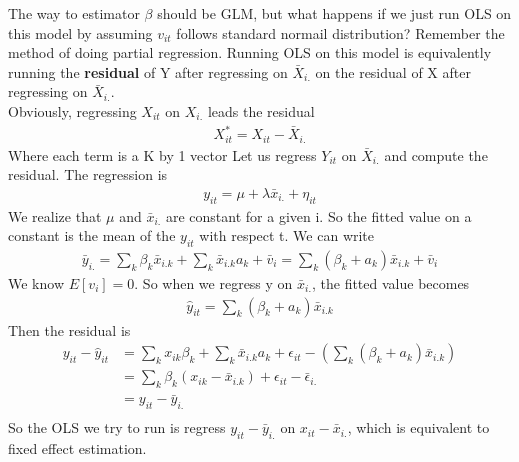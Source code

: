\documentclass[a4paper]{article}
\begin{document}
The way to estimator $\beta$ should be GLM, but what happens if we just run OLS on this model by assuming $v_{it}$ follows standard normail distribution? Remember the method of doing partial regression. Running OLS on this model is equivalently running the {\bf residual } of Y after regressing on $\bar X_{i.}$ on the residual of X after regressing on $\bar X_{i.}$. \\
Obviously, regressing $X_{it}$ on ${X_{i.}}$ leads the residual
\begin{align*}
X^{*}_{it} = X_{it} - \bar X_{i.}
\end{align*}
Where each term is a K by 1 vector
Let us regress $Y_{it}$ on ${\bar X_{i.}}$ and compute the residual. The regression is
\begin{align*}
y_{it} = \mu + \lambda \bar x_{i.} + \eta_{it}
\end{align*}
We realize that $\mu$ and $\bar x_{i.}$ are constant for a given i. So the fitted value on a constant is the mean of the $y_{it}$ with respect t.  We can write
\begin{align*}
\bar y_{i.} = \sum_k \beta_k \bar x_{i.k} + \sum_k \bar x_{i.k} a_k + \bar v_{i} = \sum_k (\beta_k + a_k) \bar x_{i.k} + \bar v_{i}
\end{align*}
We know $E[v_{i}]=0$. So when we regress y on $\bar x_{i.}$, the fitted value becomes
\begin{align*}
\hat y_{it} =  \sum_k (\beta_k + a_k) \bar x_{i.k} 
\end{align*}
Then the residual is
\begin{align*}
y_{it} - \hat y_{it} & =  \sum_k x_{ik}\beta_{k} + \sum_k \bar x_{i.k}a_k + \epsilon_{it}
                           - (\sum_k (\beta_k + a_k) \bar x_{i.k}) \\
                           & = \sum_k \beta_k(x_{ik} - \bar x_{i.k} ) + \epsilon_{it} - \bar \epsilon_{i.} \\
                           & = y_{it} - \bar y_{i.} \\
\end{align*}
So the OLS we try to run is regress $y_{it} -\bar y_{i.}$ on $x_{it} - \bar x_{i.}$, which is equivalent to fixed effect estimation.\\
\end{document}
